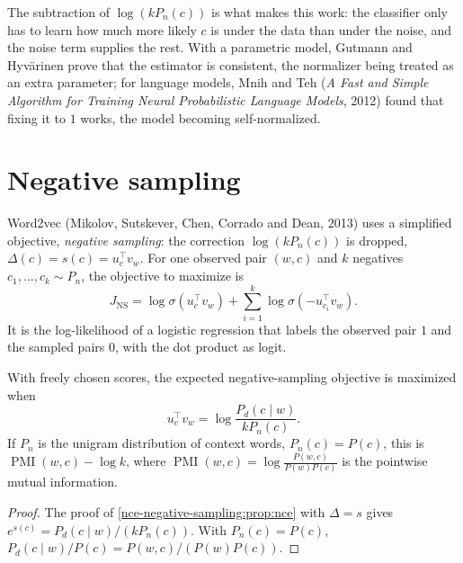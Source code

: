 \begin{notechapter}
The subtraction of $\log(kP_n(c))$ is what makes this work: the classifier only has to learn how much
more likely $c$ is under the data than under the noise, and the noise term supplies the rest.
With a parametric model, Gutmann and Hyvärinen prove that the estimator is
consistent, the normalizer being treated as an extra parameter; for language models,
Mnih and Teh (\emph{A Fast and Simple Algorithm for Training Neural Probabilistic Language
Models}, 2012) found that fixing it to $1$ works, the model becoming self-normalized.

\section{Negative sampling}\label{nce-negative-sampling:sec:ns}

Word2vec (Mikolov, Sutskever, Chen, Corrado and Dean, 2013) uses a simplified objective,
\emph{negative sampling}: the correction $\log(kP_n(c))$ is dropped, $\Delta(c) = s(c) = u_c^\top v_w$. For one observed pair $(w, c)$ and $k$
negatives $c_1,\dots,c_k\sim P_n$, the objective to maximize is
\[
  J_{\mathrm{NS}} = \log\sigma(u_c^\top v_w) + \sum_{i=1}^k\log\sigma(-u_{c_i}^\top v_w) .
\]
It is the log-likelihood of a logistic regression that labels the observed pair $1$ and the
sampled pairs $0$, with the dot product as logit.

\begin{proposition}\label{nce-negative-sampling:prop:ns}
With freely chosen scores, the expected negative-sampling objective is maximized when
\[
  u_c^\top v_w = \log\frac{P_d(c\mid w)}{kP_n(c)} .
\]
If $P_n$ is the unigram distribution of context words, $P_n(c) = P(c)$, this is $\operatorname{PMI}(w, c) - \log k$, where
$\operatorname{PMI}(w, c) = \log\frac{P(w, c)}{P(w)P(c)}$ is the pointwise mutual information.
\end{proposition}

\begin{proof}
The proof of \cref{nce-negative-sampling:prop:nce} with $\Delta = s$ gives $e^{s(c)} = P_d(c\mid w)/(kP_n(c))$. With $P_n(c) = P(c)$,
$P_d(c\mid w)/P(c) = P(w, c)/(P(w)P(c))$.
\end{proof}


\end{notechapter}
